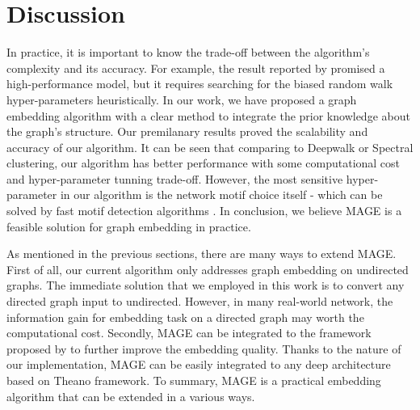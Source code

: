 \documentclass[letterpaper]{article}
\begin{document}
    \section{Discussion}

        In practice, it is important to know the trade-off between the algorithm's complexity
        and its accuracy. For example, the result reported by \cite{node2vec} promised a high-performance
        model, but it requires searching for the biased random walk hyper-parameters
        heuristically. In our work, we have proposed a graph embedding algorithm with a clear
        method to integrate the prior knowledge about the graph's structure. Our premilanary results
        proved the scalability and accuracy of our algorithm. It can be seen that comparing to 
        Deepwalk or Spectral clustering, our algorithm has better performance with some computational
        cost and hyper-parameter tunning trade-off. However, the most sensitive hyper-parameter
        in our algorithm is the network motif choice itself - which can be solved by fast motif detection
        algorithms \cite{motifdecrev}. In conclusion, we believe MAGE is a feasible solution
        for graph embedding in practice.

        As mentioned in the previous sections, there are many ways to extend MAGE\@. First of all,
        our current algorithm only addresses graph embedding on undirected graphs. The immediate 
        solution that we employed in this work is to convert any directed graph input to undirected.
        However, in many real-world network, the information gain for embedding task on a directed graph
        may worth the computational cost. Secondly, MAGE can be integrated to the framework proposed
        by \cite{planetoid} to further improve the embedding quality. Thanks to the nature of our
        implementation, MAGE can be easily integrated to any deep architecture based on Theano framework.
        To summary, MAGE is a practical embedding algorithm that can be extended in a various ways.

    
    
\end{document}
